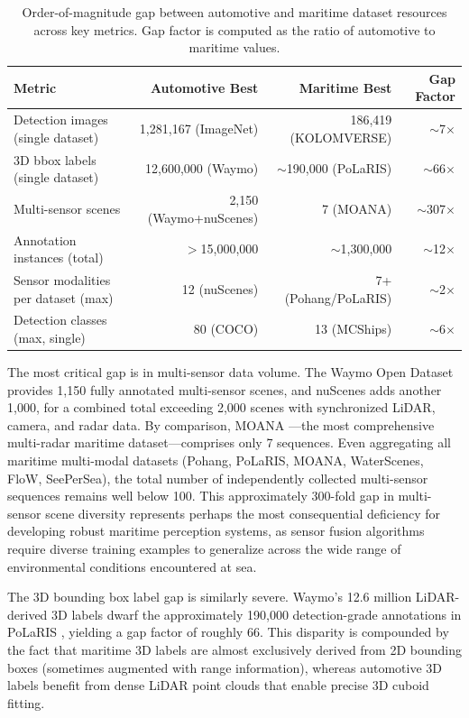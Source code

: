 \begin{table}[!htbp]
\centering
\caption{Order-of-magnitude gap between automotive and maritime dataset resources across
key metrics. Gap factor is computed as the ratio of automotive to maritime values.}
\label{tab:gap_analysis}
\small
\begin{tabularx}{\textwidth}{@{}X r r r@{}}
\toprule
\textbf{Metric} & \textbf{Automotive Best} & \textbf{Maritime Best} & \textbf{Gap Factor} \\
\midrule
Detection images (single dataset)    & 1,281,167 (ImageNet)  & 186,419 (KOLOMVERSE) & $\sim$7$\times$ \\
3D bbox labels (single dataset)      & 12,600,000 (Waymo)    & $\sim$190,000 (PoLaRIS) & $\sim$66$\times$ \\
Multi-sensor scenes                  & 2,150 (Waymo+nuScenes) & 7 (MOANA)           & $\sim$307$\times$ \\
Annotation instances (total)         & $>$15,000,000         & $\sim$1,300,000       & $\sim$12$\times$ \\
Sensor modalities per dataset (max)  & 12 (nuScenes)         & 7+ (Pohang/PoLaRIS)  & $\sim$2$\times$ \\
Detection classes (max, single)      & 80 (COCO)             & 13 (MCShips)         & $\sim$6$\times$ \\
\bottomrule
\end{tabularx}
\end{table}

The most critical gap is in multi-sensor data volume. The Waymo Open Dataset provides
1,150 fully annotated multi-sensor scenes, and nuScenes adds another 1,000, for a
combined total exceeding 2,000 scenes with synchronized LiDAR, camera, and radar data.
By comparison, MOANA \cite{Jang2024MOANA}---the most comprehensive multi-radar maritime
dataset---comprises only 7 sequences. Even aggregating all maritime multi-modal datasets
(Pohang, PoLaRIS, MOANA, WaterScenes, FloW, SeePerSea), the total number of
independently collected multi-sensor sequences remains well below 100. This
approximately 300-fold gap in multi-sensor scene diversity represents perhaps the most
consequential deficiency for developing robust maritime perception systems, as sensor
fusion algorithms require diverse training examples to generalize across the wide
range of environmental conditions encountered at sea.

The 3D bounding box label gap is similarly severe. Waymo's 12.6 million LiDAR-derived
3D labels dwarf the approximately 190,000 detection-grade annotations in PoLaRIS
\cite{Choi2024PoLaRIS}, yielding a gap factor of roughly 66. This disparity is
compounded by the fact that maritime 3D labels are almost exclusively derived from
2D bounding boxes (sometimes augmented with range information), whereas automotive
3D labels benefit from dense LiDAR point clouds that enable precise 3D cuboid
fitting.

